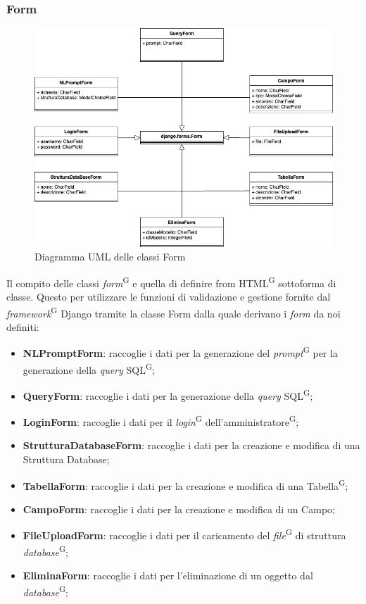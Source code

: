 \documentclass[5pt]{article}
\begin{document}
	\subsubsection{Form}
	\begin{figure}[H]
			\includegraphics[scale=0.65]{UML_classes/forms.png}
			\caption{Diagramma UML delle classi Form}
			\centering
	\end{figure}

	Il compito delle classi \textit{form}\textsuperscript{G} e quella di definire from HTML\textsuperscript{G} sottoforma di classe. Questo per utilizzare le funzioni di validazione e gestione fornite dal \textit{framework}\textsuperscript{G} Django tramite la classe Form dalla quale derivano i \textit{form} da noi definiti:
	\begin{itemize}
		\item \textbf{NLPromptForm}: raccoglie i dati per la generazione del \textit{prompt}\textsuperscript{G} per la generazione della \textit{query} SQL\textsuperscript{G};
		\item \textbf{QueryForm}: raccoglie i dati per la generazione della \textit{query} SQL\textsuperscript{G};
		\item \textbf{LoginForm}: raccoglie i dati per il \textit{login}\textsuperscript{G} dell'amministratore\textsuperscript{G};
		\item \textbf{StrutturaDatabaseForm}: raccoglie i dati per la creazione e modifica di una Struttura Database;
		\item \textbf{TabellaForm}: raccoglie i dati per la creazione e modifica di una Tabella\textsuperscript{G};
		\item \textbf{CampoForm}: raccoglie i dati per la creazione e modifica di un Campo;
		\item \textbf{FileUploadForm}: raccoglie i dati per il caricamento del \textit{file}\textsuperscript{G} di struttura \textit{database}\textsuperscript{G};
		\item \textbf{EliminaForm}: raccoglie i dati per l'eliminazione di un oggetto dal \textit{database}\textsuperscript{G};
	\end{itemize}
	
\end{document}
